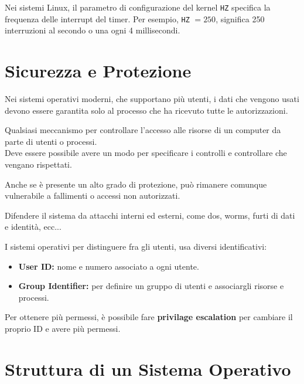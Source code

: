 \begin{note}
Nei sistemi Linux, il parametro di configurazione del kernel \texttt{HZ} specifica la frequenza delle interrupt del timer. Per esempio, \texttt{HZ} $= 250$, significa 250 interruzioni al secondo o una ogni 4 millisecondi.
\end{note}

\section{Sicurezza e Protezione}
Nei sistemi operativi moderni, che supportano più utenti, i dati che vengono usati devono essere garantita solo al processo che ha ricevuto tutte le autorizzazioni.

\begin{defn}[Protezione]
Qualsiasi meccanismo per controllare l'accesso alle risorse di un computer da parte di utenti o processi. \\
Deve essere possibile avere un modo per specificare i controlli e controllare che vengano rispettati.
\end{defn}
Anche se è presente un alto grado di protezione, può rimanere comunque vulnerabile a fallimenti o accessi non autorizzati.
\begin{defn}[Sicurezza]
Difendere il sistema da attacchi interni ed esterni, come dos, worms, furti di dati e identità, ecc...
\end{defn}
I sistemi operativi per distinguere fra gli utenti, usa diversi identificativi:
\begin{itemize}
  \item \textbf{User ID:} nome e numero associato a ogni utente.
  \item \textbf{Group Identifier:} per definire un gruppo di utenti e associargli risorse e processi.
\end{itemize}
Per ottenere più permessi, è possibile fare \textbf{privilage escalation} per cambiare il proprio ID e avere più permessi.

\section{Struttura di un Sistema Operativo}

